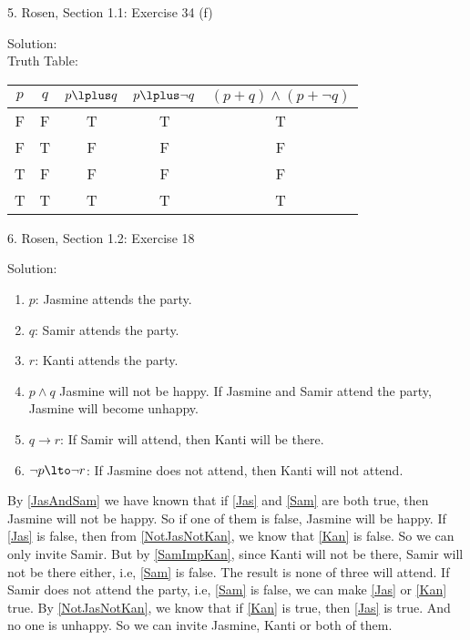 \documentclass{article}
\begin{document}
5. Rosen, Section 1.1: Exercise 34 (f)

\indent Solution:\\
\indent Truth Table:\\
\begin{center}
\begin{tabular}{c|c|c|c|c}
    $p$ & $q$ & $p \lplus q$ & $p \lplus \lnot q$ & $ (p \plus q) \land (p \plus \lnot q) $ \\
\hline
F & F & T & T & T \\
F & T & F & F & F \\
T & F & F & F & F \\
T & T & T & T & T \\
\end{tabular}
\end{center}

6. Rosen, Section 1.2: Exercise 18 

Solution:
\begin{enumerate}
\item \label{Jas} $p$: Jasmine attends the party.
\item \label{Sam} $q$: Samir attends the party.
\item \label{Kan} $r$: Kanti attends the party.
\item \label{JasAndSam} $p \land q$ \to Jasmine will not be happy. If Jasmine and Samir attend the party, Jasmine will become unhappy.
\item \label{SamImpKan} $q \to r$: If Samir will attend, then Kanti will be there.
\item \label{NotJasNotKan} $\lnot p \lto \lnot r$: If Jasmine does not attend, then Kanti will not attend.
\end{enumerate}

By \ref{JasAndSam} we have known that if \ref{Jas} and \ref{Sam} are both true, then Jasmine will not be happy. So if one of them is false, Jasmine will be happy. If \ref{Jas} is false, then from \ref{NotJasNotKan}, we know that \ref{Kan}  is false. So we can only invite Samir. But by \ref{SamImpKan}, since Kanti will not be there, Samir will not be there either, i.e, \ref{Sam}  is false. The result is none of three will attend. If Samir does not attend the party, i.e, \ref{Sam} is false, we can make \ref{Jas}  or \ref{Kan} true. By \ref{NotJasNotKan}, we know that if \ref{Kan} is true, then \ref{Jas} is true. And no one is unhappy. So we can invite Jasmine, Kanti or both of them.  
\end{document}
